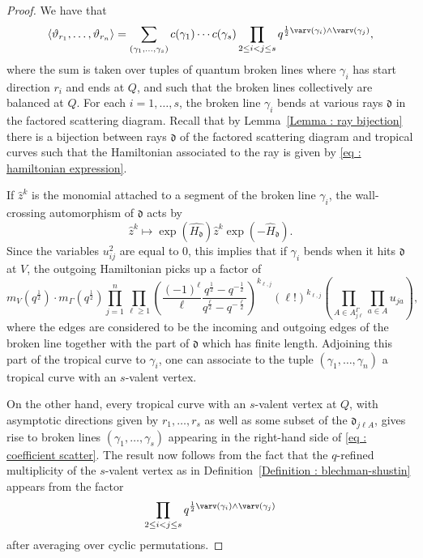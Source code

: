 \documentclass[11pt]{amsart}
\numberwithin{equation}{section}
\theoremstyle{plain}
\theoremstyle{remark}
\theoremstyle{definition}
\newcommand\fd{\mathfrak d}
\begin{document}
\begin{proof}
    We have that 
\begin{equation}\label{eq : coefficient scatter}
    \left\langle \vartheta_{r_1}, \dots, \vartheta_{r_n} \right\rangle =\sum_{(\gamma_1,\dots,\gamma_s)} c(\gamma_1) \cdots  c(\gamma_s) \prod_{2 \leq i < j \leq s} q^{\frac{1}{2}\varv(\gamma_i) \wedge \varv(\gamma_j)}, 
\end{equation}
 where the sum is taken over tuples of quantum broken lines where $\gamma_i$ has start direction $r_i$ and ends at $Q$, and such that the broken lines collectively are balanced at $Q$. For each $i=1,\dots, s$, the broken line $\gamma_i$ bends at various rays $\fd$ in the factored scattering diagram. Recall that by Lemma~\ref{Lemma : ray bijection} there is a bijection between rays $\fd$ of the factored scattering diagram and tropical curves such that the Hamiltonian associated to the ray is given by \eqref{eq : hamiltonian expression}.

 If $\hat{z}^k$ is the monomial attached to a segment of the broken line $\gamma_i$, the wall-crossing automorphism of $\fd$ acts by 
 $$\hat{z}^k \longmapsto \exp\left(\hat{H_{\fd}}\right)\hat{z}^k \exp\left(-\hat{H}_{\fd}\right).$$
 Since the variables $u_{ij}^2$ are equal to $0$, this implies that if $\gamma_i$ bends when it hits $\fd$ at $V$, the outgoing Hamiltonian picks up a factor of
 $$m_V\left(q^{\frac{1}{2}}\right) \cdot m_{\Gamma}\left(q^{\frac{1}{2}}\right)\prod_{j=1}^n \prod_{\ell \geq 1}\left(\frac{(-1)^{\ell}}{\ell} \frac{q^{\frac{1}{2}} - q^{-\frac{1}{2}}}{q^{\frac{\ell}{2}} - q^{-\frac{\ell}{2}}}\right)^{k_{\ell,j}} (\ell !)^{k_{\ell,j}} \left(\prod_{A \in A^{\Gamma}_{j \ell}} \prod_{a \in A} u_{ja}\right),$$
    where the edges are considered to be the incoming and outgoing edges of the broken line together with the part of $\fd$ which has finite length. Adjoining this part of the tropical curve to $\gamma_i$, one can associate to the tuple $(\gamma_1,\dots,\gamma_n)$ a tropical curve with an $s$-valent vertex. 

    On the other hand, every tropical curve with an $s$-valent vertex at $Q$, with asymptotic directions given by $r_1,\dots,r_s$ as well as some subset of the $\fd_{j \ell A}$, gives rise to broken lines $(\gamma_1,\dots,\gamma_s)$ appearing in the right-hand side of \eqref{eq : coefficient scatter}. The result now follows from the fact that the $q$-refined multiplicity of the $s$-valent vertex as in Definition~\ref{Definition : blechman-shustin} appears from the factor $$ \prod_{2 \leq i < j \leq s} q^{\frac{1}{2}\varv(\gamma_i) \wedge \varv(\gamma_j)}$$ after averaging over cyclic permutations.
\end{proof}
\end{document}
